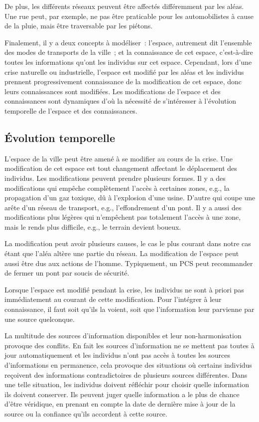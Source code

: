 \documentclass[a4paper]{article}
\begin{document}
De plus, les différents réseaux peuvent être affectés différemment par les
aléas. Une rue peut, par exemple, ne pas être praticable pour les automobilistes
à cause de la pluie, mais être traversable par les piétons.

Finalement, il y a deux concepts à modéliser~: l'espace, autrement dit
l'ensemble des modes de transports de la ville~; et la connaissance de cet
espace, c'est-à-dire toutes les informations qu'ont les individus sur cet
espace. Cependant, lors d'une crise naturelle ou industrielle, l'espace est
modifié par les aléas et les individus prennent progressivement connaissance
de la modification de cet espace, donc leurs connaissances sont modifiées. Les
modifications de l'espace et des connaissances sont dynamiques d'où la nécessité
de s'intéresser à l'évolution temporelle de l'espace et des connaissances.

  \subsection{Évolution temporelle}

L'espace de la ville peut être amené à se modifier au cours de la crise. Une
modification de cet espace est tout changement affectant le déplacement des
individus. Les modifications peuvent prendre plusieurs formes. Il y a des
modifications qui empêche complètement l'accès à certaines zones, e.g., la
propagation d'un gaz toxique, dû à l'explosion d'une usine. D'autre qui coupe
une arête d'un réseau de transport, e.g., l'effondrement d'un pont. Il y a aussi
des modifications plus légères qui n'empêchent pas totalement l'accès à une
zone, mais le rends plus difficile, e.g., le terrain devient boueux.

La modification peut avoir plusieurs causes, le cas le plus courant dans notre
cas étant que l'aléa altère une partie du réseau. La modification de l'espace
peut aussi être dus aux actions de l'homme. Typiquement, un PCS peut
recommander de fermer un pont par soucis de sécurité.

Lorsque l'espace est modifié pendant la crise, les individus ne sont à priori
pas immédiatement au courant de cette modification. Pour l'intégrer à leur
connaissance, il faut soit qu'ils la voient, soit que l'information leur
parvienne par une source quelconque.

La multitude des sources d'information disponibles et leur non-harmonisation
provoque des conflits. En fait les sources d'information ne se mettent pas
toutes à jour automatiquement et les individus n'ont pas accès à toutes les
sources d'informations en permanence, cela provoque des situations où certains
individus reçoivent des informations contradictoires de plusieurs sources
différentes. Dans une telle situation, les individus doivent réfléchir pour
choisir quelle information ils doivent conserver. Ils peuvent juger quelle
information a le plus de chance d'être véridique, en prenant en compte la date
de dernière mise à jour de la source ou la confiance qu'ils accordent à cette
source.
\end{document}
